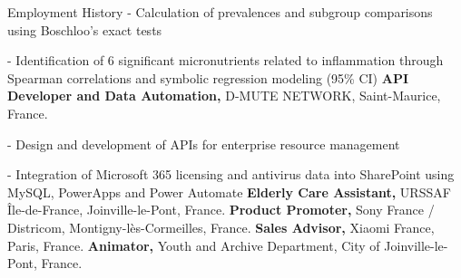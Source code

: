 \begin{rubric}{Employment History}
- Calculation of prevalences and subgroup comparisons using Boschloo's exact tests\par
- Identification of 6 significant micronutrients related to inflammation through Spearman correlations and symbolic regression modeling (95\% CI)
%
\textbf{API Developer and Data Automation, %
} D-MUTE NETWORK, Saint-Maurice, France.\par
- Design and development of APIs for enterprise resource management\par
- Integration of Microsoft 365 licensing and antivirus data into SharePoint using MySQL, PowerApps and Power Automate
%
\textbf{Elderly Care Assistant, %
} URSSAF Île-de-France, Joinville-le-Pont, France.
%
\textbf{Product Promoter,%
} Sony France / Districom, Montigny-lès-Cormeilles, France.
%
\textbf{Sales Advisor,%
} Xiaomi France, Paris, France.
%
\textbf{Animator,%
} Youth and Archive Department, City of Joinville-le-Pont, France.
\end{rubric}
